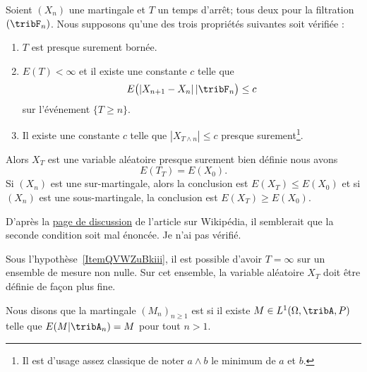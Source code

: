 \begin{theorem} \label{ThoZTrdjtZ}
	Soient \( (X_n)\) une martingale et \( T\) un temps d'arrêt; tous deux pour la filtration \( (\tribF_n)\). Nous supposons qu'une des trois propriétés suivantes soit vérifiée :
	\begin{enumerate}
		\item
		      \( T\) est presque surement bornée.
		\item
		      \( E(T)<\infty\) et il existe une constante \( c\) telle que
		      \begin{equation}
			      E\big( | X_{n+1}-X_n |\,|\tribF_n \big)\leq c
		      \end{equation}
		      sur l'événement \( \{ T\geq n \}\).
		\item   \label{ItemQVWZuBkiii}
		      Il existe une constante \( c\) telle que \( | X_{T\wedge n} |\leq c\) presque surement\footnote{Il est d'usage assez classique de noter \( a\wedge b\) le minimum de \( a\) et \( b\).}.
	\end{enumerate}
	Alors \( X_T\) est une variable aléatoire presque surement bien définie nous avons
	\begin{equation}
		E(T_T)=E(X_0).
	\end{equation}
	Si \( (X_n)\) est une sur-martingale, alors la conclusion est \( E(X_T)\leq E(X_0)\) et si \( (X_n)\) est une sous-martingale, la conclusion est \( E(X_T)\geq E(X_0)\).
\end{theorem}

\begin{probleme}
	D'après la \href{https://en.wikipedia.org/wiki/Talk:Optional_stopping_theorem}{page de discussion} de l'article sur Wikipédia, il semblerait que la seconde condition soit mal énoncée. Je n'ai pas vérifié.
\end{probleme}

\begin{remark}
	Sous l'hypothèse~\ref{ItemQVWZuBkiii}, il est possible d'avoir \( T=\infty\) sur un ensemble de mesure non nulle. Sur cet ensemble, la variable aléatoire \( X_T\) doit être définie de façon plus fine.
\end{remark}

\begin{definition}
	Nous disons que la martingale \( (M_n)_{n\geq 1}\) est  si il existe \( M\in L^1(\Omega,\tribA,P)\) telle que \( E(M|\tribA_n)=M\) pour tout \( n>1\).
\end{definition}

